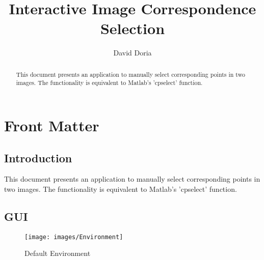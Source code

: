 \documentclass{InsightArticle}
\title{Interactive Image Correspondence Selection}
\author{David Doria}
\newcommand{\IJhandlerIDnumber}{3233}
\begin{document}
\IJhandlefooter{\IJhandlerIDnumber}


\ifpdf
\else
\fi


\maketitle


\ifhtml
\chapter*{Front Matter\label{front}}
\fi

\begin{abstract}
\noindent
This document presents an application to manually select corresponding points in two images. The functionality is equivalent to Matlab's 'cpselect' function.

\end{abstract}

\IJhandlenote{\IJhandlerIDnumber}

\tableofcontents
\section{Introduction}
This document presents an application to manually select corresponding points in two images. The functionality is equivalent to Matlab's 'cpselect' function.

\section{GUI}
\label{sec:GUI}

\begin{center}
	\begin{figure}[H]
  \centering
		\texttt{[image: images/Environment]}
		\caption{Default Environment}
		\label{fig:Environment}
	\end{figure}
\end{center} 

% 

% 
% 
\end{document}
